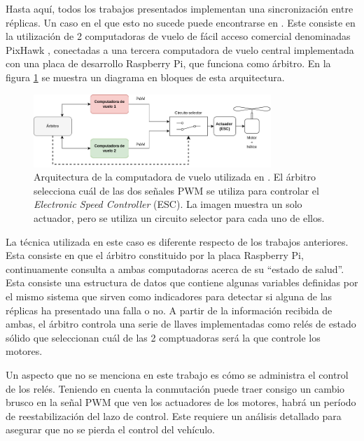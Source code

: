 Hasta aquí, todos los trabajos presentados implementan una sincronización entre réplicas. Un caso en el que esto no sucede puede encontrarse en \cite{thesis_redundant_ROS}. Este consiste en la utilización de 2 computadoras de vuelo de fácil acceso comercial denominadas PixHawk \cite{dronecode-foundation-2023}, conectadas a una tercera computadora de vuelo central implementada con una placa de desarrollo Raspberry Pi, que funciona como árbitro. En la figura \ref{fig:ROS_redundancy} se muestra un diagrama en bloques de esta arquitectura.

\begin{figure}[H]
    \centering
    \includegraphics[width=0.8\textwidth]{img/ROS_redundancy.png}
    \caption{Arquitectura de la computadora de vuelo utilizada en \cite{thesis_redundant_ROS}. El árbitro selecciona cuál de las dos señales PWM se utiliza para controlar el \textit{Electronic Speed Controller} (ESC). La imagen muestra un solo actuador, pero se utiliza un circuito selector para cada uno de ellos.}
    \label{fig:ROS_redundancy}
\end{figure}

La técnica utilizada en este caso es diferente respecto de los trabajos anteriores. Esta consiste en que el árbitro constituido por la placa Raspberry Pi, continuamente consulta a ambas computadoras acerca de su ``estado de salud''. Esta consiste una estructura de datos que contiene algunas variables definidas por el mismo sistema que sirven como indicadores para detectar si alguna de las réplicas ha presentado una falla o no. A partir de la información recibida de ambas, el árbitro controla una serie de llaves implementadas como relés de estado sólido que seleccionan cuál de las 2 comptuadoras será la que controle los motores.

Un aspecto que no se menciona en este trabajo es cómo se administra el control de los relés. Teniendo en cuenta la conmutación puede traer consigo un cambio brusco en la señal PWM que ven los actuadores de los motores, habrá un período de reestabilización del lazo de control. Este requiere un análisis detallado para asegurar que no se pierda el control del vehículo.




